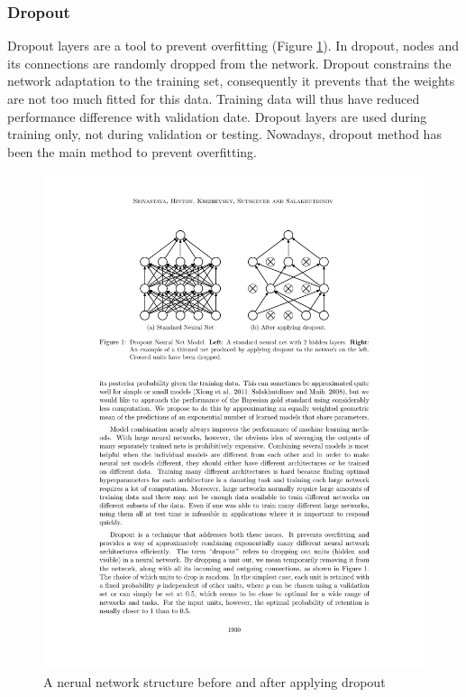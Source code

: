     \subsubsection{Dropout}
    Dropout layers\cite{srivastava2014dropout} are a tool to prevent overfitting (Figure \ref{dropout}). In dropout, nodes and its connections are randomly dropped from the network. Dropout constrains the network adaptation to the training set, consequently it prevents that the weights are not too much fitted for this data. Training data will thus have reduced performance difference with validation date. Dropout layers are used during training only, not during validation or testing. Nowadays, dropout method has been the main method to prevent overfitting.

    \begin{figure}[!h]
        \centering
        \includegraphics[scale=0.7]{Figures/dropout.pdf}
        \caption{A nerual network structure before and after applying dropout}
        \label{dropout}
    \end{figure}

